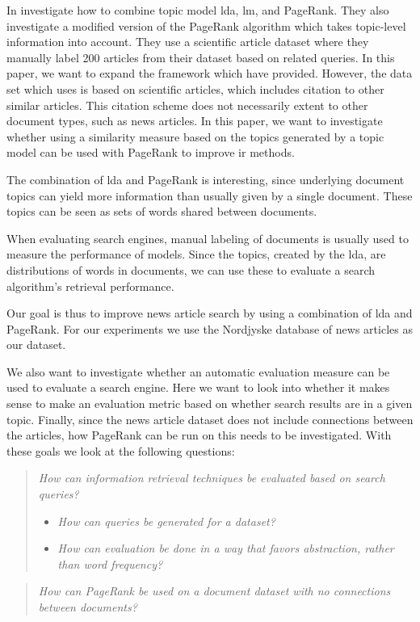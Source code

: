 In \cite{yang2009topic} \citeauthor{yang2009topic} investigate how to combine topic model \gls{lda}, \gls{lm}, and PageRank.
They also investigate a modified version of the PageRank algorithm which takes topic-level information into account.
They use a scientific article dataset where they manually label 200 articles from their dataset based on related queries. 
In this paper, we want to expand the framework which \cite{yang2009topic} have provided.
However, the data set which \cite{yang2009topic} uses is based on scientific articles, which includes citation to other similar articles.
This citation scheme does not necessarily extent to other document types, such as news articles.
In this paper, we want to investigate whether using a similarity measure based on the topics generated by a topic model can be used with PageRank to improve \gls{ir} methods.

The combination of \gls{lda} and PageRank is interesting, since underlying document topics can yield more information than usually given by a single document.
These topics can be seen as sets of words shared between documents. 

When evaluating search engines, manual labeling of documents is usually used to measure the performance of models\cite{yang2009topic}\cite{Tang2008}.
Since the topics, created by the \gls{lda}, are distributions of words in documents, we can use these to evaluate a search algorithm's retrieval performance. 

Our goal is thus to improve news article search by using a combination of \gls{lda} and PageRank.
For our experiments we use the Nordjyske database of news articles as our dataset.

We also want to investigate whether an automatic evaluation measure can be used to evaluate a search engine.
Here we want to look into whether it makes sense to make an evaluation metric based on whether search results are in a given topic.
Finally, since the news article dataset does not include connections between the articles, how PageRank can be run on this needs to be investigated.
With these goals we look at the following questions:

\begin{quote}
	\emph{How can information retrieval techniques be evaluated based on search queries?}
	\begin{itemize}
		\item \emph{How can queries be generated for a dataset?}
		\item \emph{How can evaluation be done in a way that favors abstraction, rather than word frequency?}
	\end{itemize}
\end{quote}
\vspace{0.1 cm}

\begin{quote}
	\emph{How can PageRank be used on a document dataset with no connections between documents?}
\end{quote}




